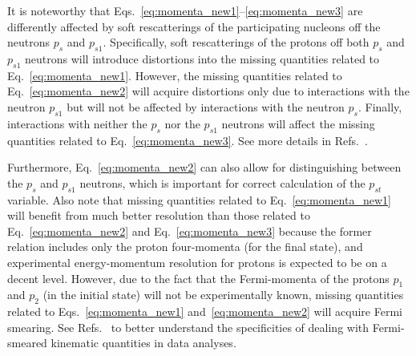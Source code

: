 It is noteworthy that Eqs.~\eqref{eq:momenta_new1}--\eqref{eq:momenta_new3} are differently affected by soft rescatterings of the participating nucleons off the neutrons $p_{s}$ and $p_{s1}$. Specifically, soft rescatterings of the protons off both $p_{s}$ and $p_{s1}$ neutrons will introduce distortions into the missing quantities related to Eq.~\eqref{eq:momenta_new1}. However, the missing quantities related to Eq.~\eqref{eq:momenta_new2} will acquire distortions only due to interactions with the neutron $p_{s1}$ but will not be affected by interactions with the neutron $p_{s}$. Finally, interactions with neither the $p_{s}$ nor the $p_{s1}$ neutrons will affect the missing quantities related to Eq.~\eqref{eq:momenta_new3}. See more details in Refs.~\cite{CLAS:2023mfc,my_an_note:2020,my_thesis:2021}.


Furthermore, Eq.~\eqref{eq:momenta_new2} can also allow for distinguishing between the $p_{s}$ and $p_{s1}$ neutrons, which is important for correct calculation of the $p_{st}$ variable. Also note that missing quantities related to Eq.~\eqref{eq:momenta_new1} will benefit from much better resolution than those related to Eq.~\eqref{eq:momenta_new2} and Eq.~\eqref{eq:momenta_new3} because the former relation includes only the proton four-momenta (for the final state), and experimental energy-momentum resolution for protons is expected to be on a decent level. However, due to the fact that the Fermi-momenta of the protons $p_{1}$ and $p_{2}$ (in the initial state) will not be experimentally known, missing quantities related to Eqs.~\eqref{eq:momenta_new1} and~\eqref{eq:momenta_new2} will acquire Fermi smearing. See Refs.~\cite{CLAS:2023mfc,my_an_note:2020,my_thesis:2021,Skorodumina:2015rea, CLAS:2022kta,note_mm_distr} to better understand the specificities of dealing with Fermi-smeared kinematic quantities in data analyses.


